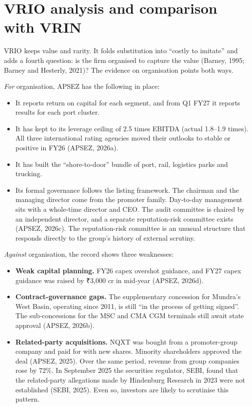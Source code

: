 \documentclass[12pt, a4paper]{article}
\begin{document}
\section{VRIO analysis and comparison with VRIN}\label{sec:vrio}
VRIO keeps value and rarity. It folds substitution into ``costly to imitate''
and adds a fourth question: is the firm organised to capture the value (Barney,
1995; Barney and Hesterly, 2021)? The evidence on organisation points both ways.

\emph{For} organisation, APSEZ has the following in place:
\begin{itemize}
  \item It reports return on capital for each segment, and from Q1 FY27 it
        reports results for each port cluster.
  \item It has kept to its leverage ceiling of 2.5 times EBITDA (actual
        1.8--1.9 times). All three international rating agencies moved their
        outlooks to stable or positive in FY26 (APSEZ, 2026a).
  \item It has built the ``shore-to-door'' bundle of port, rail, logistics
        parks and trucking.
  \item Its formal governance follows the listing framework. The chairman and
        the managing director come from the promoter family. Day-to-day
        management sits with a whole-time director and CEO. The audit committee
        is chaired by an independent director, and a separate reputation-risk
        committee exists (APSEZ, 2026c). The reputation-risk committee is an
        unusual structure that responds directly to the group's history of
        external scrutiny.
\end{itemize}

\emph{Against} organisation, the record shows three weaknesses:
\begin{itemize}
  \item \textbf{Weak capital planning.} FY26 capex overshot guidance, and FY27
        capex guidance was raised by ₹3,000 cr in mid-year (APSEZ, 2026d).
  \item \textbf{Contract-governance gaps.} The supplementary concession for
        Mundra's West Basin, operating since 2011, is still ``in the process of
        getting signed''. The sub-concessions for the MSC and CMA CGM terminals
        still await state approval (APSEZ, 2026b).
  \item \textbf{Related-party acquisitions.} NQXT was bought from a
        promoter-group company and paid for with new shares. Minority
        shareholders approved the deal (APSEZ, 2025). Over the same period,
        revenue from group companies rose by 72\%. In September 2025 the
        securities regulator, SEBI, found that the related-party allegations
        made by Hindenburg Research in 2023 were not established (SEBI, 2025).
        Even so, investors are likely to scrutinise this pattern.
\end{itemize}
\end{document}
